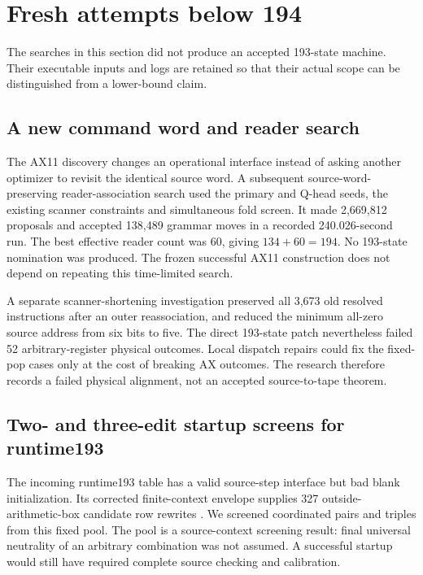 \section{Fresh attempts below 194}
\label{sec:research}

The searches in this section did not produce an accepted 193-state machine.
Their executable inputs and logs are retained so that their actual scope
can be distinguished from a lower-bound claim.

\subsection{A new command word and reader search}

The AX11 discovery changes an operational interface instead of asking
another optimizer to revisit the identical source word. A subsequent
source-word-preserving reader-association search used the primary and
Q-head seeds, the existing scanner constraints and simultaneous fold
screen. It made 2,669,812 proposals and accepted 138,489 grammar moves
in a recorded 240.026-second run. The best effective reader count was
60, giving $134+60=194$. No 193-state nomination was produced.
The frozen successful AX11 construction does not depend on repeating
this time-limited search.

A separate scanner-shortening investigation preserved all 3,673 old
resolved instructions after an outer reassociation, and reduced the
minimum all-zero source address from six bits to five. The direct 193-state
patch nevertheless failed 52 arbitrary-register physical outcomes.
Local dispatch repairs could fix the fixed-pop cases only at the cost of
breaking AX outcomes. The research therefore records a failed physical
alignment, not an accepted source-to-tape theorem.

\subsection{Two- and three-edit startup screens for runtime193}

The incoming runtime193 table has a valid source-step interface but bad
blank initialization. Its corrected finite-context envelope supplies
327 outside-arithmetic-box candidate row rewrites \cite{runtime193}.
We screened coordinated pairs and triples from this fixed pool. The
pool is a source-context screening result: final universal neutrality of
an arbitrary combination was not assumed. A successful startup would
still have required complete source checking and calibration.

